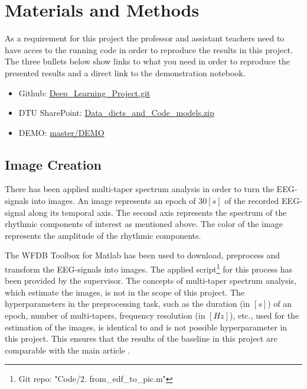 \section{Materials and Methods}
\label{sec:materials_and_methods}

 As a requirement for this project the professor and assistant teachers need to have acces to the running code in order to reproduce the results in this project. 
 The three bullets below show links to what you need in order to reproduce the presented results and a direct link to the demonstration notebook.
 \begin{itemize}
 	\item Github: \href{https://github.com/anderslaunerbaek/Deep\_Learning\_Project.git}{Deep\_Learning\_Project.git}
 	\item DTU SharePoint: \href{https://dtudk-my.sharepoint.com/personal/s160159\_win\_dtu\_dk/\_layouts/15/guestaccess.aspx?docid=093aa4dcaee0b4e3aa18b0ee67061a678&authkey=AbdnyuYwQUWn0BDEPeDn1Mg&e=b79a063cd72d43a9b7db88f8b8fd1b06}{Data\_dicts\_and\_Code\_models.zip}
 	\item DEMO: \href{https://github.com/anderslaunerbaek/Deep_Learning_Project/tree/master/DEMO}{master/DEMO}
 \end{itemize}

\subsection{Image Creation}
There has been applied multi-taper spectrum analysis in order to turn the EEG-signals into images. An image represents an epoch of $30\left[s \right]$ of the recorded EEG-signal along its temporal axis. The second axis represents the spectrum of the rhythmic components of interest as mentioned above. The color of the image represents the amplitude of the rhythmic components.

The WFDB Toolbox \cite{matlab} for Matlab has been used to download, preprocess and transform the EEG-signals into images. The applied script\footnote{Git repo: "Code/2. from\_edf\_to\_pic.m"} for this process has been provided by the supervisor. 
The concepts of multi-taper spectrum analysis, which estimate the images, is not in the scope of this project. The hyperparameters in the preprocessing task, such as the duration (in $\left[s \right]$) of an epoch, number of multi-tapers, frequency resolution (in $\left[Hz \right]$), etc., used for the estimation of the images, is identical to \cite{main_ar} and is not possible hyperparameter in this project. This ensures that the results of the baseline in this project are comparable with the main article \cite{main_ar}. 

